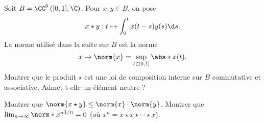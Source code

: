\begin{enonce}
\begin{exercise}[ID={Cahier RMS6 17 (X),question a.},subtitle={},tags={}, difficulty={0}]
Soit $B=\CC^0\left( [0,1],\C \right)$. Pour $x,y\in B$, on pose
\begin{equation*}
    x \star y : t\mapsto \int_0^t x(t-s) y(s)\d s.
\end{equation*}
La norme utilisé dans la suite sur $B$ est la norme
\begin{equation*}
    x\mapsto \norm{x}=\sup_{t\in[0,1]} \abs*{x(t)}.
\end{equation*}
Montrer que le produit $\star$ est une loi de composition interne sur $B$ commutative et associative. Admet-t-elle un élément neutre ?

Montrer que $\norm{x\star y}\leq\norm{x} \cdot\norm{y}$.
Montrer que $\lim_{n\to\infty} \norm*{x^n}^{1/n}=0$ (où $x^n=x\star x\star\dotsm\star x$).
\end{exercise}
\begin{solution}
\end{solution}
\end{enonce}
